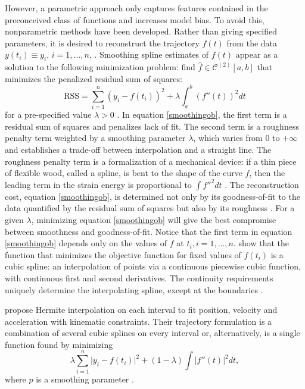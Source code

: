 However, a parametric approach only captures features contained in the preconceived class of functions \citep{yao2005functional} and increases model bias. To avoid this, nonparametric methods have been developed. Rather than giving specified parameters, it is desired to reconstruct the trajectory $f(t)$ from the data $y(t_i)\equiv y_i$, $i=1, \ldots, n$, \citep{craven1978smoothing}. Smoothing spline estimates of $f(t)$ appear as a solution to the following minimization problem: find $\hat{f} \in \mathcal{C}^{(2)}[a,b]$ that minimizes the penalized residual sum of squares:
\begin{equation}\label{smoothingob}
\mbox{RSS}=\sum_{i=1}^{n}\left(  y_i-f(t_i)\right)^2+\lambda\int_{a}^{b} \left(f''(t)\right)^2dt
\end{equation}
for a pre-specified value $\lambda>0$ \citep{aydin2012smoothing}. In equation  \eqref{smoothingob}, the first term is a residual sum of squares and penalizes lack of fit. The second term is a roughness penalty term weighted by a smoothing parameter $\lambda$, which varies from 0 to $+\infty$ and establishes a trade-off between interpolation and a straight line. The roughness penalty term is a formalization of a mechanical device: if a thin piece of flexible wood, called a spline, is bent to the shape of the curve $f$, then the leading term in the strain energy is proportional to $\int f''^2dt$ \citep{green1993nonparametric}. The reconstruction cost, equation \eqref{smoothingob}, is determined not only by its goodness-of-fit to the data quantified by the residual sum of squares but also by its roughness \citep{schwarz2012geodesy}. For a given $\lambda$, minimizing equation \eqref{smoothingob} will give the best compromise between smoothness and goodness-of-fit. Notice that the first term in equation \eqref{smoothingob} depends only on the values of $f$ at $t_i, i=1, \ldots, n$. \cite{green1993nonparametric} show that the function that minimizes the objective function for fixed values of $f(t_i)$ is a cubic spline: an interpolation of points via a continuous piecewise cubic function, with continuous first and second derivatives. The continuity requirements uniquely determine the interpolating spline, except at the boundaries \citep{sealfon2005smoothing}.


\cite{zhang2013cubic} propose Hermite interpolation on each interval to fit position, velocity and acceleration with kinematic constraints. Their trajectory formulation is a combination of several cubic splines on every interval or, alternatively, is a single function found by minimizing 
\begin{equation}
\lambda\sum_{i=1}^{n}\lvert y_i-f(t_i) \rvert^2+(1-\lambda)\int \lvert f''(t) \rvert^2dt,
\end{equation}
where $p$ is a smoothing parameter \citep{castro2006geometric}. 


